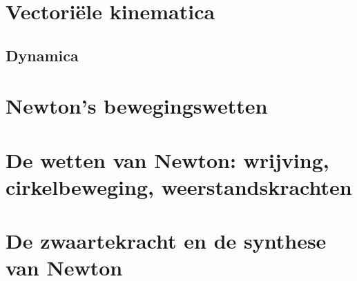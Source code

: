 \documentclass{exam}
\begin{document}
\vspace*{\fill}

\newpage

\section{Vectoriële kinematica}

\vspace{0.5cm}



\newpage

\vspace*{\fill}
\begin{center}
    
\section*{Dynamica}
\end{center}

\vspace*{\fill}

\newpage

\section{Newton's bewegingswetten}

\vspace{0.5cm}



\newpage

\section{De wetten van Newton: wrijving, cirkelbeweging, weerstandskrachten}

\vspace{0.5cm}



\newpage

\section{De zwaartekracht en de synthese van Newton}

\vspace{0.5cm}


\end{document}
